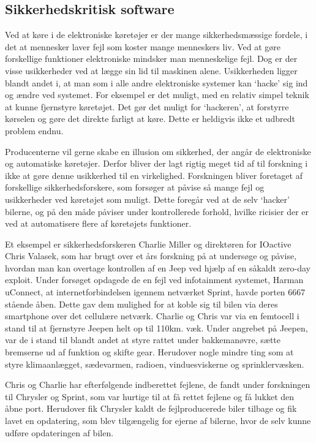 \subsection{Sikkerhedskritisk software}
Ved at køre i de elektroniske køretøjer er der mange sikkerhedsmæssige fordele, i det at mennesker laver fejl som koster mange menneskers liv. Ved at gøre forskellige funktioner elektroniske mindsker man menneskelige fejl. Dog er der visse usikkerheder ved at lægge sin lid til maskinen alene. Usikkerheden ligger blandt andet i, at man som i alle andre elektroniske systemer kan `hacke' sig ind og ændre ved systemet. For eksempel er det muligt, med en relativ simpel teknik at kunne fjernstyre køretøjet. Det gør det muligt for `hackeren', at forstyrre kørselen og gøre det direkte farligt at køre. Dette er heldigvis ikke et udbredt problem endnu.  

Producenterne vil gerne skabe en illusion om sikkerhed, der angår de elektroniske og automatiske køretøjer. Derfor bliver der lagt rigtig meget tid af til forskning i ikke at gøre denne usikkerhed til en virkelighed. Forskningen bliver foretaget af forskellige sikkerhedsforskere, som forsøger at påvise så mange fejl og usikkerheder ved køretøjet som muligt. Dette foregår ved at de selv `hacker' bilerne, og på den måde påviser under kontrollerede forhold, hvilke ricisier der er ved at automatisere flere af køretøjets funktioner.  


Et eksempel er sikkerhedsforskeren Charlie Miller og direktøren for IOactive Chris Valasek, som har brugt over et års forskning på at undersøge og påvise, hvordan man kan overtage kontrollen af en Jeep ved hjælp af en såkaldt zero-day exploit. Under forsøget opdagede de en fejl ved infotainment systemet, Harman uConnect, at internetforbindelsen igennem netværket Sprint, havde porten 6667 stående åben. Dette gav dem mulighed for at koble sig til bilen via deres smartphone over det cellulære netværk. Charlie og Chris var via en femtocell i stand til at fjernstyre Jeepen helt op til 110km. væk. Under angrebet på Jeepen, var de i stand til blandt andet at styre rattet under bakkemanøvre, sætte bremserne ud af funktion og skifte gear. Herudover nogle mindre ting som at styre klimaanlægget, sædevarmen, radioen, vinduesviskerne og sprinklervæsken.  

Chris og Charlie har efterfølgende indberettet fejlene, de fandt under forskningen til Chrysler og Sprint, som var hurtige til at få rettet fejlene og få lukket den åbne port. Herudover fik Chrysler kaldt de fejlproducerede biler tilbage og fik lavet en opdatering, som blev tilgængelig for ejerne af bilerne, hvor de selv kunne udføre opdateringen af bilen.   

